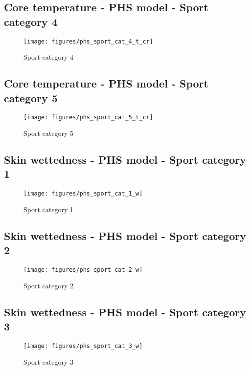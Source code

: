 \documentclass[11pt]{article}
\begin{document}
    \subsection{Core temperature - PHS model - Sport category 4}
    \begin{figure}[htb!]
        \centering
        \texttt{[image: figures/phs\_sport\_cat\_4\_t\_cr]}
        \caption{Sport category 4}\label{fig:phs_sport_cat_4}
    \end{figure}

    \clearpage

    \subsection{Core temperature - PHS model - Sport category 5}
    \begin{figure}[htb!]
        \centering
        \texttt{[image: figures/phs\_sport\_cat\_5\_t\_cr]}
        \caption{Sport category 5}\label{fig:phs_sport_cat_5}
    \end{figure}

    \clearpage

    \subsection{Skin wettedness - PHS model - Sport category 1}
    \begin{figure}[htb!]
        \centering
        \texttt{[image: figures/phs\_sport\_cat\_1\_w]}
        \caption{Sport category 1}\label{fig:phs_sport_cat_1_w}
    \end{figure}

    \clearpage

    \subsection{Skin wettedness - PHS model - Sport category 2}
    \begin{figure}[htb!]
        \centering
        \texttt{[image: figures/phs\_sport\_cat\_2\_w]}
        \caption{Sport category 2}\label{fig:phs_sport_cat_2_w}
    \end{figure}

    \clearpage

    \subsection{Skin wettedness - PHS model - Sport category 3}
    \begin{figure}[htb!]
        \centering
        \texttt{[image: figures/phs\_sport\_cat\_3\_w]}
        \caption{Sport category 3}\label{fig:phs_sport_cat_3_w}
    \end{figure}
\end{document}
